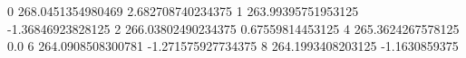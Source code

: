 0 268.0451354980469 2.682708740234375
1 263.99395751953125 -1.36846923828125
2 266.03802490234375 0.67559814453125
4 265.3624267578125 0.0
6 264.0908508300781 -1.271575927734375
8 264.1993408203125 -1.1630859375
